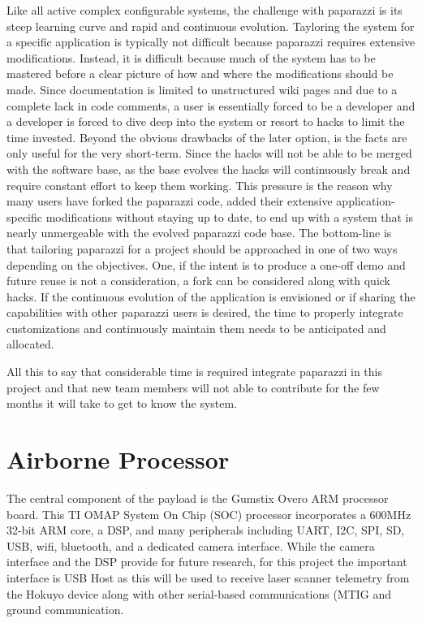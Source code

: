 \documentclass[a4paper,11pt]{report}
\begin{document}
Like all active complex configurable systems, the challenge with paparazzi is its steep learning curve and rapid and continuous evolution. Tayloring the system for a specific application is typically not difficult because paparazzi requires extensive modifications. Instead, it is difficult because much of the system has to be mastered before a clear picture of how and where the modifications should be made. Since documentation is limited to unstructured wiki pages and due to a complete lack in code comments, a user is essentially forced to be a developer and a developer is forced to dive deep into the system or resort to hacks to limit the time invested. Beyond the obvious drawbacks of the later option, is the facts are only useful for the very short-term. Since the hacks will not be able to be merged with the software base, as the base evolves the hacks will continuously break and require constant effort to keep them working. This pressure is the reason why many users have forked the paparazzi code, added their extensive application-specific modifications without staying up to date, to end up with a system that is nearly unmergeable with the evolved paparazzi code base. The bottom-line is that tailoring paparazzi for a project should be approached in one of two ways depending on the objectives. One, if the intent is to produce a one-off demo and future reuse is not a consideration, a fork can be considered along with quick hacks. If the continuous evolution of the application is envisioned or if sharing the capabilities with other paparazzi users is desired, the time to properly integrate customizations and continuously maintain them needs to be anticipated and allocated.

All this to say that considerable time is required integrate paparazzi in this project and that new team members will not able to contribute for the few months it will take to get to know the system.

\section{Airborne Processor}
\label{sec:AirborneProcessor}

The central component of the payload is the Gumstix Overo ARM processor board. This TI OMAP System On Chip (SOC) processor incorporates a 600MHz 32-bit ARM core, a DSP, and many peripherals including UART, I2C, SPI, SD, USB, wifi, bluetooth, and a dedicated camera interface. While the camera interface and the DSP provide for future research, for this project the important interface is USB Host as this will be used to receive laser scanner telemetry from the Hokuyo device along with other serial-based communications (MTIG and ground communication.
\end{document}
